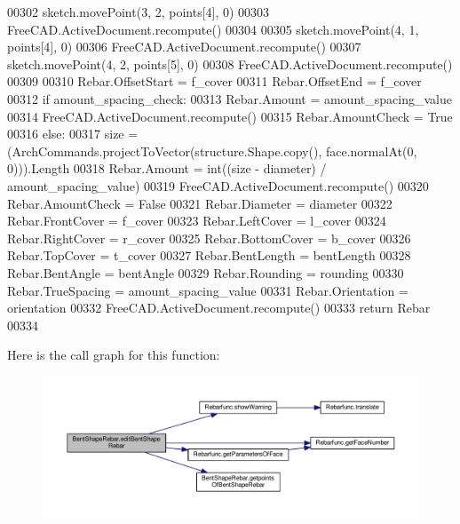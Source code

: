 \begin{DoxyCode}
00302     sketch.movePoint(3, 2, points[4], 0)
00303     FreeCAD.ActiveDocument.recompute()
00304 
00305     sketch.movePoint(4, 1, points[4], 0)
00306     FreeCAD.ActiveDocument.recompute()
00307     sketch.movePoint(4, 2, points[5], 0)
00308     FreeCAD.ActiveDocument.recompute()
00309 
00310     Rebar.OffsetStart = f\_cover
00311     Rebar.OffsetEnd = f\_cover
00312     \textcolor{keywordflow}{if} amount\_spacing\_check:
00313         Rebar.Amount = amount\_spacing\_value
00314         FreeCAD.ActiveDocument.recompute()
00315         Rebar.AmountCheck = \textcolor{keyword}{True}
00316     \textcolor{keywordflow}{else}:
00317         size = (ArchCommands.projectToVector(structure.Shape.copy(), face.normalAt(0, 0))).Length
00318         Rebar.Amount = int((size - diameter) / amount\_spacing\_value)
00319         FreeCAD.ActiveDocument.recompute()
00320         Rebar.AmountCheck = \textcolor{keyword}{False}
00321     Rebar.Diameter = diameter
00322     Rebar.FrontCover = f\_cover
00323     Rebar.LeftCover = l\_cover
00324     Rebar.RightCover = r\_cover
00325     Rebar.BottomCover = b\_cover
00326     Rebar.TopCover = t\_cover
00327     Rebar.BentLength = bentLength
00328     Rebar.BentAngle = bentAngle
00329     Rebar.Rounding = rounding
00330     Rebar.TrueSpacing = amount\_spacing\_value
00331     Rebar.Orientation = orientation
00332     FreeCAD.ActiveDocument.recompute()
00333     \textcolor{keywordflow}{return} Rebar
00334 
\end{DoxyCode}


Here is the call graph for this function\+:\nopagebreak
\begin{figure}[H]
\begin{center}
\leavevmode
\includegraphics[width=350pt]{namespaceBentShapeRebar_a941d005845cd497c0beb12bb8fef9171_cgraph}
\end{center}
\end{figure}




